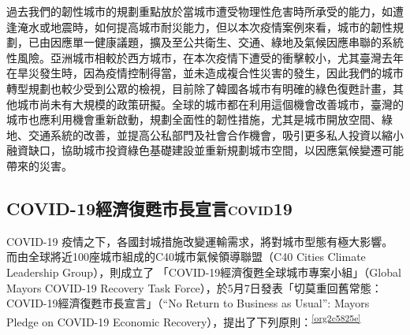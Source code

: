 \documentclass[a4paper,12pt]{article}
\begin{document}
\begin{itemize}
過去我們的韌性城市的規劃重點放於當城市遭受物理性危害時所承受的能力，如遭逢淹水或地震時，如何提高城市耐災能力，但以本次疫情案例來看，城市的韌性規劃，已由因應單一健康議題，擴及至公共衛生、交通、綠地及氣候因應串聯的系統性風險。亞洲城市相較於西方城市，在本次疫情下遭受的衝擊較小，尤其臺灣去年在旱災發生時，因為疫情控制得當，並未造成複合性災害的發生，因此我們的城市轉型規劃也較少受到公眾的檢視，目前除了韓國各城市有明確的綠色復甦計畫，其他城市尚未有大規模的政策研擬。全球的城市都在利用這個機會改善城市，臺灣的城市也應利用機會重新啟動，規劃全面性的韌性措施，尤其是城市開放空間、綠地、交通系統的改善，並提高公私部門及社會合作機會，吸引更多私人投資以縮小融資缺口，協助城市投資綠色基礎建設並重新規劃城市空間，以因應氣候變遷可能帶來的災害。\\
\end{itemize}

\subsection{COVID-19經濟復甦市長宣言\hfill{}\textsc{covid19}}
\label{sec:orge578901}
COVID-19 疫情之下，各國封城措施改變運輸需求，將對城市型態有極大影響。而由全球將近100座城市組成的C40城市氣候領導聯盟（C40 Cities Climate Leadership Group），則成立了 「COVID-19經濟復甦全球城市專案小組」（Global Mayors COVID-19 Recovery Task Force），於5月7日發表「切莫重回舊常態：COVID-19經濟復甦市長宣言」（“No Return to Business as Usual”: Mayors Pledge on COVID-19 Economic Recovery），提出了下列原則：\textsuperscript{\ref{org2c5825e}}\\
\end{document}
